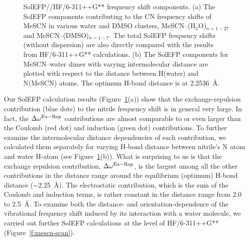 \documentclass[b5paper,oneside,fleqn,11pt]{book}
\begin{document}
\begin{refsection}
%
\begin{figure}[t!]
\centering
\setlength\fboxsep{0.4pt}
\setlength\fboxrule{0.5pt}
\caption{
SolEFP//HF/6-311++G** frequency shift components. (a) The SolEFP components contributing to the CN
frequency shifts of MeSCN in various water and DMSO clusters, MeSCN--(H$_2$O)$_{n=1-27}$ 
and MeSCN--(DMSO)$_{n=1-7}$.
The total SolEFP frequency shifts (without dispersion) 
are also directly compared with the results from HF/6-311++G**
calculations. (b) The SolEFP components for MeSCN--water dimer with varying intermolecular distance are
plotted with respect to the distance between H(water) and N(MeSCN) atoms. The optimum H-bond distance
is at 2.2536~\AA.
\label{f:mescn-solefp-qm}}
\end{figure}
%
Our SolEFP calculation results (Figure~\ref{f:mescn-solefp-qm}(a)) show that the
exchange\hyp{}repulsion contribution (blue dots) to the nitrile
frequency shift is in general very large. In fact, the $\Delta\omega^{\rm Ex-Rep}$
contributions are almost comparable to or even larger than
the Coulomb (red dot) and induction (green dot) contributions.
To further examine the intermolecular distance dependencies
of each contribution, we calculated them separately for
varying H-bond distance between nitrile's N atom and water
H-atom (see Figure~\ref{f:mescn-solefp-qm}(b)). What is surprising to us is that the
exchange repulsion contribution, $\Delta\omega^{\rm Ex-Rep}$, is the largest among
all the other contributions in the distance range around the
equilibrium (optimum) H-bond distance ($\sim$2.25~\AA). The
electrostatic contribution, which is the sum of the Coulomb
and induction terms, is rather constant in the distance range
from 2.0 to 2.5~\AA. To examine both the distance- and
orientation\hyp{}dependence of the vibrational frequency shift
induced by its interaction with a water molecule, we carried
out further SolEFP calculations at the level of HF/6-311++G**
(Figure~\ref{f:mescn-scan}). 
%
\begin{figure}[t!]

\end{figure}
\end{refsection}
\end{document}
